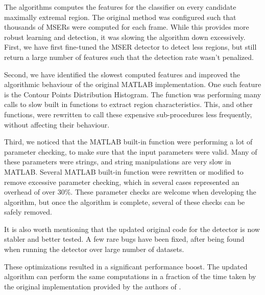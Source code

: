 		The algorithms computes the features for the classifier on every candidate maximally extremal region. The original method was configured such that thousands of MSERs were computed for each frame. While this provides more robust learning and detection, it was slowing the algorithm down excessively. First, we have first fine-tuned the MSER detector to detect less regions, but still return a large number of features such that the detection rate wasn't penalized.
		
		Second, we have identified the slowest computed features and improved the algorithmic behaviour of the original MATLAB implementation. One such feature is the Contour Points Distribution Histogram. The function was performing many calls to slow built in functions to extract region characteristics. This, and other functions, were rewritten to call these expensive sub-procedures less frequently, without affecting their behaviour.
		
		Third, we noticed that the MATLAB built-in function were performing a lot of parameter checking, to make sure that the input parameters were valid. Many of these parameters were strings, and string manipulations are very slow in MATLAB. Several MATLAB built-in function were rewritten or modified to remove excessive parameter checking, which in several cases represented an overhead of over $30\%$. These parameter checks are welcome when developing the algorithm, but once the algorithm is complete, several of these checks can be safely removed.
		
		It is also worth mentioning that the updated original code for the detector is now stabler and better tested. A few rare bugs have been fixed, after being found when running the detector over large number of datasets.
		
		These optimizations resulted in a significant performance boost. The updated algorithm can perform the same computations in a fraction of the time taken by the original implementation provided by the authors of \cite{arteta12}.
	